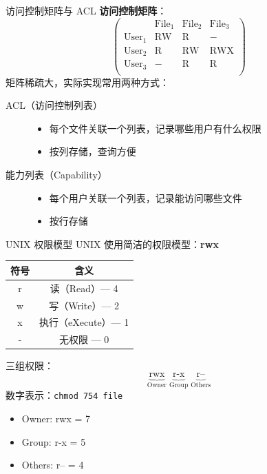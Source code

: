 \documentclass[10pt, aspectratio=169]{beamer}
\begin{document}
\begin{frame}{访问控制矩阵与 ACL}
    \textbf{访问控制矩阵}：
    \[
    \begin{pmatrix}
        & \text{File}_1 & \text{File}_2 & \text{File}_3 \\
        \text{User}_1 & \text{RW} & \text{R} & - \\
        \text{User}_2 & \text{R} & \text{RW} & \text{RWX} \\
        \text{User}_3 & - & \text{R} & \text{R} \\
    \end{pmatrix}
    \]
    \vspace{0.5em}
    矩阵稀疏大，实际实现常用两种方式：
    \begin{description}
        \item[ACL（访问控制列表）]
            \begin{itemize}
                \item 每个文件关联一个列表，记录哪些用户有什么权限
                \item 按列存储，查询方便
            \end{itemize}
        \item[能力列表（Capability）]
            \begin{itemize}
                \item 每个用户关联一个列表，记录能访问哪些文件
                \item 按行存储
            \end{itemize}
    \end{description}
\end{frame}

\begin{frame}{UNIX 权限模型}
    UNIX 使用简洁的权限模型：\textbf{rwx}
    \vspace{0.5em}
    \begin{center}
        \begin{tabular}{|c|c|}
            \hline
            \textbf{符号} & \textbf{含义} \\
            \hline
            r & 读（Read）--- 4 \\
            w & 写（Write）--- 2 \\
            x & 执行（eXecute）--- 1 \\
            - & 无权限 --- 0 \\
            \hline
        \end{tabular}
    \end{center}
    \vspace{0.5em}
    三组权限：
    \[
    \underbrace{\text{rwx}}_{\text{Owner}} \;
    \underbrace{\text{r-x}}_{\text{Group}} \;
    \underbrace{\text{r--}}_{\text{Others}}
    \]
    \vspace{0.5em}
    数字表示：\texttt{chmod 754 file}
    \begin{itemize}
        \item Owner: rwx = 7
        \item Group: r-x = 5
        \item Others: r-- = 4
    \end{itemize}
\end{frame}
\end{document}
